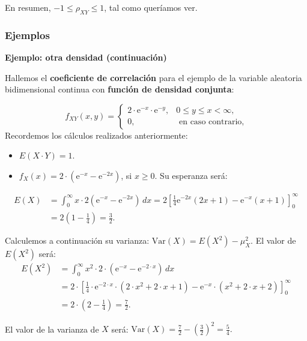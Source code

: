\documentclass[]{book}
\begin{document}
En resumen, \(-1\leq\rho_{XY}\leq 1\), tal como queríamos ver.

\hypertarget{ejemplos-5}{%
\subsubsection{Ejemplos}\label{ejemplos-5}}

\textbf{Ejemplo: otra densidad (continuación)}

Hallemos el \textbf{coeficiente de correlación} para el ejemplo de la variable aleatoria bidimensional continua con \textbf{función de densidad conjunta}:

\[
f_{XY}(x,y)=\begin{cases}
2\cdot  \mathrm{e}^{-x}\cdot \mathrm{e}^{-y}, & 0\leq y\leq x < \infty,\\
0, & \mbox{ en caso contrario,}
\end{cases}
\]
Recordemos los cálculos realizados anteriormente:

\begin{itemize}
\item
  \(E(X\cdot Y)=1.\)
\item
  \(f_X(x)=2\cdot \left(\mathrm{e}^{-x}-\mathrm{e}^{-2x}\right)\), si \(x\geq 0\). Su esperanza será:
\end{itemize}

\[
\begin{array}{rl}
E(X)&=\int_0^\infty x\cdot 2\left(\mathrm{e}^{-x}-\mathrm{e}^{-2x}\right)\, dx=2 \left[\frac{1}{4} \mathrm{e}^{-2 x} (2 x+1)-\mathrm{e}^{-x}(x+1)\right]_0^\infty \\
& = 2\left(1-\frac{1}{4}\right)=\frac{3}{2}.
\end{array}
\]

Calculemos a continuación su varianza: \(\mathrm{Var}(X)=E\left(X^2\right)-\mu_X^2\). El valor de \(E\left(X^2\right)\) será:
\[
\begin{array}{rl}
E\left(X^2\right) & =\displaystyle \int_0^\infty x^2 \cdot 2\cdot \left(\mathrm{e}^{-x}-\mathrm{e}^{-2\cdot x}\right)\, dx\\
&=\displaystyle 2 \cdot  \left[\frac{1}{4} \cdot \mathrm{e}^{-2 \cdot x} \cdot  (2\cdot x^2+2\cdot x+1)- \mathrm{e}^{-x} \cdot (x^2+2\cdot x+2)\right]_0^\infty \\ & = 2\cdot \left(2-\frac{1}{4}\right)=\frac{7}{2}.
\end{array}
\]

El valor de la varianza de \(X\) será: \(\mathrm{Var}(X)=\frac{7}{2}-\left(\frac{3}{2}\right)^2 = \frac{5}{4}.\)
\end{document}
